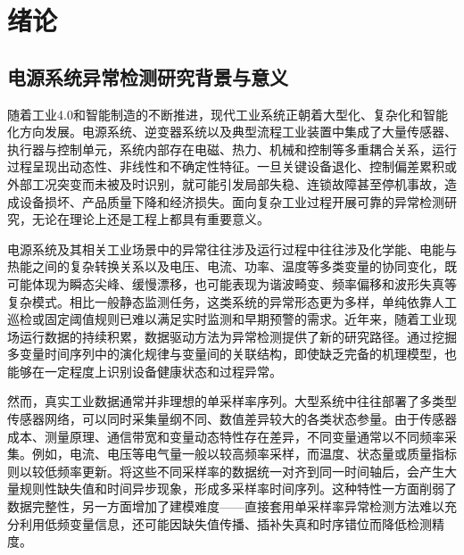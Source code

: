 \documentclass[bachelor, vlined]{DissertUESTC}
\begin{document}
	
	\tableofcontents  %
	
	
	
	
	\chapter{绪论}

	\section{电源系统异常检测研究背景与意义}

    随着工业4.0和智能制造的不断推进，现代工业系统正朝着大型化、复杂化和智能化方向发展。电源系统、逆变器系统以及典型流程工业装置中集成了大量传感器、执行器与控制单元，系统内部存在电磁、热力、机械和控制等多重耦合关系，运行过程呈现出动态性、非线性和不确定性特征。一旦关键设备退化、控制偏差累积或外部工况突变而未被及时识别，就可能引发局部失稳、连锁故障甚至停机事故，造成设备损坏、产品质量下降和经济损失。面向复杂工业过程开展可靠的异常检测研究，无论在理论上还是工程上都具有重要意义。

    电源系统及其相关工业场景中的异常往往涉及运行过程中往往涉及化学能、电能与热能之间的复杂转换关系以及电压、电流、功率、温度等多类变量的协同变化，既可能体现为瞬态尖峰、缓慢漂移，也可能表现为谐波畸变、频率偏移和波形失真等复杂模式。相比一般静态监测任务，这类系统的异常形态更为多样，单纯依靠人工巡检或固定阈值规则已难以满足实时监测和早期预警的需求。近年来，随着工业现场运行数据的持续积累，数据驱动方法为异常检测提供了新的研究路径。通过挖掘多变量时间序列中的演化规律与变量间的关联结构，即使缺乏完备的机理模型，也能够在一定程度上识别设备健康状态和过程异常。
    
    然而，真实工业数据通常并非理想的单采样率序列。大型系统中往往部署了多类型传感器网络，可以同时采集量纲不同、数值差异较大的各类状态参量。由于传感器成本、测量原理、通信带宽和变量动态特性存在差异，不同变量通常以不同频率采集。例如，电流、电压等电气量一般以较高频率采样，而温度、状态量或质量指标则以较低频率更新。将这些不同采样率的数据统一对齐到同一时间轴后，会产生大量规则性缺失值和时间异步现象，形成多采样率时间序列。这种特性一方面削弱了数据完整性，另一方面增加了建模难度——直接套用单采样率异常检测方法难以充分利用低频变量信息，还可能因缺失值传播、插补失真和时序错位而降低检测精度。
    
\end{document}
